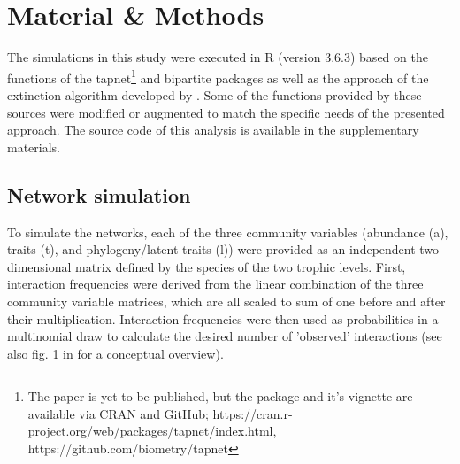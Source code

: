 \documentclass[12pt,a4paper]{article}
\begin{document}
%	

\newpage

	\section{Material \& Methods}
	The simulations in this study were executed in R \parencite{Rcore} (version 3.6.3) based on the functions of the tapnet\footnote{The paper is yet to be published, but the package and it's vignette are available via CRAN and GitHub; https://cran.r-project.org/web/packages/tapnet/index.html, https://github.com/biometry/tapnet} \parencite{Benadi} and bipartite \parencite{Dormann2008} packages as well as the approach of the extinction algorithm developed by \citeauthor{Vizentin-Bugoni2019} \parencite{Vizentin-Bugoni2019}. Some of the functions provided by these sources were modified or augmented to match the specific needs of the presented approach. The source code of this analysis is available in the supplementary materials. \par



	\subsection{Network simulation} \label{sec:net_sim}
	To simulate the networks, each of the three community variables (abundance (a), traits (t), and phylogeny/latent traits (l)) were provided as an independent two-dimensional matrix defined by the species of the two trophic levels. First, interaction frequencies were derived from the linear combination of the three community variable matrices, which are all scaled to sum of one before and after their multiplication. Interaction frequencies were then used as probabilities in a multinomial draw to calculate the desired number of 'observed' interactions (see also fig. 1 in \cite{Benadi} for a conceptual overview). \par
\end{document}
